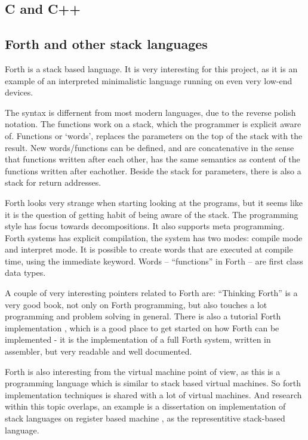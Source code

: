 \documentclass[11pt]{report}
\begin{document}
\subsection{C and C++}

\subsection{Forth and other stack languages}
Forth is a stack based language.
It is very interesting for this project, as it is an example of an interpreted minimalistic language running on even very low-end devices.

The syntax is differnent from most modern languages, due to the reverse polish notation.
The functions work on a stack, which the programmer is explicit aware of. 
Functions or `words', replaces the parameters on the top of the stack with the result. 
New words/functions can be defined, and are concatenative in the sense that functions written after each other, has the same semantics as content of the functions written after eachother.
Beside the stack for parameters, there is also a stack for return addresses.

Forth looks very strange when starting looking at the programs, but it seems like it is the question of getting habit of being aware of the stack.
The programming style has focus towards decompositions. It also supports meta programming.
Forth systems has explicit compilation, the system has two modes: compile mode and interpret mode. 
It is possible to create words that are executed at compile time, using the immediate keyword.
Words -- ``functions'' in Forth -- are first class data types.

A couple of very interesting pointers related to Forth are: 
``Thinking Forth'' is a very good book, not only on Forth programming, but also touches a lot programming and problem solving in general.
There is also a tutorial Forth implementation \cite{jonesforth}, which is a good place to get started on how Forth can be implemented - it is the implementation of a full Forth system, written in assembler, but very readable and well documented.

Forth is also interesting from the virtual machine point of view, as this is a programming language which is similar to stack based virtual machines. So forth implementation techniques is shared with a lot of virtual machines. And research within this topic overlaps, an example is a dissertation on implementation of stack languages on register based machine \cite{ertl-dissertation}, as the representitive stack-based language.
\end{document}
